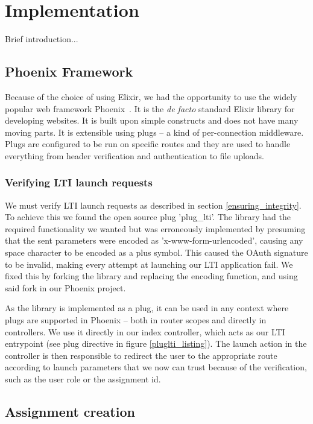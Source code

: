 \chapter{Implementation}

Brief introduction...

\section{Phoenix Framework}

Because of the choice of using Elixir, we had the opportunity to use the widely popular web framework Phoenix~\cite{Phoenix}. It is the \textit{de facto} standard Elixir library for developing websites. It is built upon simple constructs and does not have many moving parts. It is extensible using plugs -- a kind of per-connection middleware. Plugs are configured to be run on specific routes and they are used to handle everything from header verification and authentication to file uploads.

\subsection{Verifying LTI launch requests}

We must verify LTI launch requests as described in section \ref{ensuring_integrity}. To achieve this we found the open source plug 'plug\_lti'. The library had the required functionality we wanted but was erroneously implemented by presuming that the sent parameters were encoded as 'x-www-form-urlencoded', causing any space character to be encoded as a plus symbol. This caused the OAuth signature to be invalid, making every attempt at launching our LTI application fail. We fixed this by forking the library and replacing the encoding function, and using said fork in our Phoenix project.

As the library is implemented as a plug, it can be used in any context where plugs are supported in Phoenix -- both in router scopes and directly in controllers. We use it directly in our index controller, which acts as our LTI entrypoint (see plug directive in figure \ref{pluglti_listing}). The launch action in the controller is then responsible to redirect the user to the appropriate route according to launch parameters that we now can trust because of the verification, such as the user role or the assignment id.

\section{Assignment creation}

